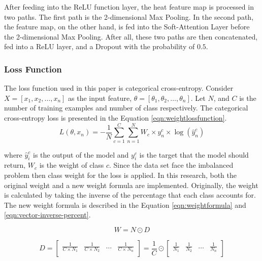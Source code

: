 \documentclass[sensors,article,submit,pdftex,moreauthors]{Definitions/mdpi}
\begin{document}
	After feeding into the ReLU function layer, the heat feature map is processed in two paths. The first path is the 2-dimensional Max Pooling. In the second path, the feature map, on the other hand, is fed into the Soft-Attention Layer before the 2-dimensional Max Pooling. After all, these two paths are then concatenated, fed into a ReLU layer, and a Dropout with the probability of $0.5$.
	
	
	\subsubsection{Loss Function}
	The loss function used in this paper is categorical cross-entropy. Consider $X = [x_1, x_2, \dots, x_n]$ as the input feature, $\theta = [\theta_1, \theta_2, \dots, \theta_n]$. Let $N$, and $C$ is the number of training examples and number of class respectively. The categorical cross-entropy loss is presented in the Equation \ref{eqn:weightlossfunction}.
	\begin{equation}
		\label{eqn:weightlossfunction}
		L(\theta, x_n) = -\frac{1}{N}\sum_{c=1}^{C}\sum_{n=1}^{N}W_c\times y^c_n \times \log(\hat{y}^c_n)
	\end{equation}
	
	where $\hat{y}^c_i$  is the output of the model and $y^c_i$ is the target that the model should return, $W_c$ is the weight of class $c$. Since the data set face the imbalanced problem then class weight for the loss is applied. In this research, both the original weight and a new weight formula are implemented. Originally, the weight is calculated by taking the inverse of the percentage that each class accounts for. The new weight formula is described in the Equation \ref{eqn:weightformula} and \ref{eqn:vector-inverse-percent}. 
	
	\begin{equation}
		\label{eqn:weightformula}
		W = N \odot D
	\end{equation}
	
	\begin{equation}
		\label{eqn:vector-inverse-percent}
		D = \begin{bmatrix}
			\frac{1}{C \times  N_1} & \frac{1}{C \times  N_2} & \dots & \frac{1}{C \times  N_n}\\
		\end{bmatrix} = \frac{1}{C} \odot \begin{bmatrix}
			\frac{1}{N_1} & \frac{1}{N_2} & \dots & \frac{1}{N_n}\\
		\end{bmatrix}
	\end{equation}
	
\end{document}
